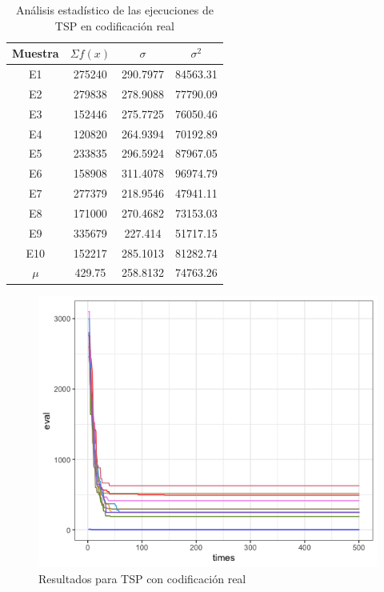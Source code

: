 \documentclass[letterpaper,12pt]{article}
\theoremstyle{definition}
\begin{document}
\begin{table}
  \begin{center}
    \begin{tabular}{cccc}
      \toprule 
        Muestra & \(\Sigma f(x)\) & \(\sigma\)  & \(\sigma^2\)  \\
        \midrule
        \rowcolor{black!20} E1 & 275240 & 290.7977 & 84563.31 \\
        E2 & 279838 & 278.9088 & 77790.09 \\
        \rowcolor{black!20} E3 & 152446 & 275.7725 & 76050.46\\
        E4 & 120820 & 264.9394 & 70192.89\\
        \rowcolor{black!20} E5 & 233835 & 296.5924 & 87967.05 \\
        E6 & 158908 & 311.4078 & 96974.79 \\
        \rowcolor{black!20} E7 & 277379 & 218.9546 & 47941.11 \\
        E8 & 171000 & 270.4682 & 73153.03\\
        \rowcolor{black!20} E9 & 335679 & 227.414 & 51717.15 \\
        E10 & 152217 & 285.1013 & 81282.74 \\
        \rowcolor{black!20} \(\mu\) & 429.75 & 258.8132 & 74763.26 \\ 
        \bottomrule
      \end{tabular}
  \end{center}
  \caption{Análisis estadístico de las ejecuciones de TSP en codificación real}
  \label{tab:tspreal}  
\end{table}

\begin{figure}[H]
  
  \includegraphics[width=\linewidth]{real_tsp}
  \caption{Resultados para TSP con codificación real}
  \label{fig:tspreal}
\end{figure}
\end{document}
